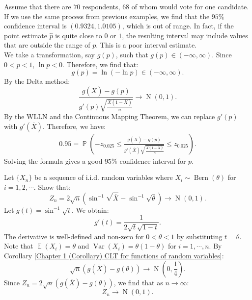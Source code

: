 \documentclass{huhtakm-template-book-v2}
\DeclareMathOperator{\prob}{\mathbb{P}}
\DeclareMathOperator{\E}{\mathbb{E}}
\DeclareMathOperator{\Var}{Var}
\DeclareMathOperator{\Bern}{Bern}
\DeclareMathOperator{\N}{N}
\begin{document}
    \begin{eg}
        Assume that there are $70$ respondents, $68$ of whom would vote for one candidate.\\
        If we use the same process from previous examples, we find that the $95\%$ confidence interval is $(0.9324, 1.0105)$, which is out of range. In fact, if the point estimate $\hat{p}$ is quite close to $0$ or $1$, the resulting interval may include values that are outside the range of $p$. This is a poor interval estimate.\\
        We take a transformation, say $g(p)$, such that $g(p) \in (-\infty, \infty)$. Since $0 < p < 1$, $\ln{p} < 0$. Therefore, we find that:
        \begin{equation*}
            g(p) = \ln(-\ln{p}) \in (-\infty, \infty).
        \end{equation*}
        By the Delta method:
        \begin{equation*}
            \frac{g(\overline{X}) - g(p)}{g'(p) \sqrt{\frac{\overline{X}(1 - \overline{X})}{n}}} \to \N(0, 1).
        \end{equation*}
        By the WLLN and the Continuous Mapping Theorem, we can replace $g'(p)$ with $g'(\overline{X})$. Therefore, we have:
        \begin{align*}
            0.95 = \prob\left(-z_{0.025} \leq \frac{g(\overline{X}) - g(p)}{g'(\overline{X}) \sqrt{\frac{\overline{X}(1 - \overline{X})}{n}}} \leq z_{0.025}\right).
        \end{align*}
        Solving the formula gives a good $95\%$ confidence interval for $p$.
    \end{eg}
    \begin{eg}
        Let $\{X_{n}\}$ be a sequence of i.i.d. random variables where $X_{i} \sim \Bern(\theta)$ for $i = 1, 2, \cdots$. Show that:
        \begin{equation*}
            Z_{n} = 2\sqrt{n}\left(\sin^{-1}{\sqrt{\overline{X}}} - \sin^{-1}{\sqrt{\theta}}\right) \to \N(0, 1).
        \end{equation*}
        Let $g(t) = \sin^{-1}{\sqrt{t}}$. We obtain:
        \begin{equation*}
            g'(t) = \frac{1}{2\sqrt{t}\sqrt{1 - t}}.
        \end{equation*}
        The derivative is well-defined and non-zero for $0 < \theta < 1$ by substituting $t = \theta$. Note that $\E(X_{i}) = \theta$ and $\Var(X_{i}) = \theta(1 - \theta)$ for $i = 1, \cdots, n$. By Corollary \ref{Chapter 1 (Corollary) CLT for functions of random variables}:
        \begin{equation*}
            \sqrt{n}(g(\overline{X}) - g(\theta)) \to \N\left(0, \frac{1}{4}\right).
        \end{equation*}
        Since $Z_{n} = 2\sqrt{n}(g(\overline{X}) - g(\theta))$, we find that as $n \to \infty$:
        \begin{equation*}
            Z_{n} \to \N(0, 1).
        \end{equation*}
    \end{eg}
\end{document}
